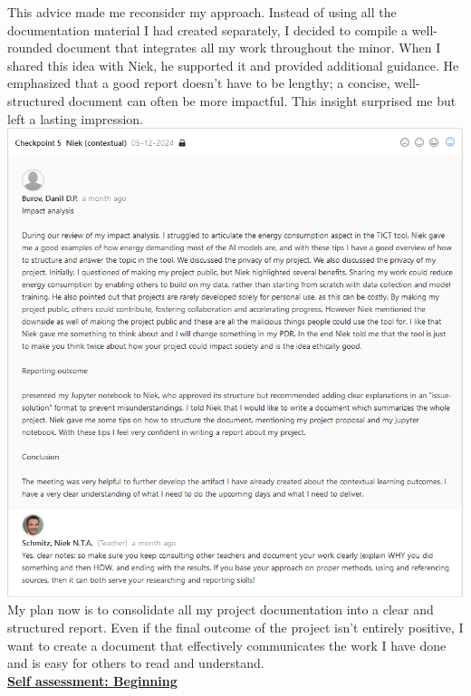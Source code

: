 \documentclass{article}
\begin{document}
This advice made me reconsider my approach. Instead of using all the documentation material I had created separately, I decided to compile a well-rounded document that integrates all my work throughout the minor. When I shared this idea with Niek, he supported it and provided additional guidance. He emphasized that a good report doesn’t have to be lengthy; a concise, well-structured document can often be more impactful. This insight surprised me but left a lasting impression.\\
\includegraphics[width=\textwidth,keepaspectratio]{images/Feedback_Niek_2.png}\\

My plan now is to consolidate all my project documentation into a clear and structured report. Even if the final outcome of the project isn’t entirely positive, I want to create a document that effectively communicates the work I have done and is easy for others to read and understand.\\
  \underline{\textbf{Self assessment: Beginning}}
\end{document}
